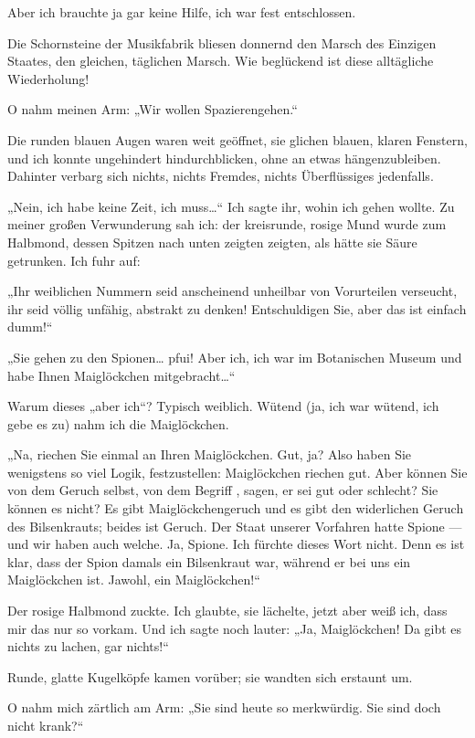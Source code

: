 Aber ich brauchte ja gar keine Hilfe, ich war fest entschlossen.

Die Schornsteine der Musikfabrik bliesen donnernd den Marsch des
Einzigen Staates, den gleichen, täglichen Marsch. Wie beglückend
ist diese alltägliche Wiederholung!

O nahm meinen Arm: „Wir wollen Spazierengehen.“

Die runden blauen
Augen waren weit geöffnet, sie glichen
blauen, klaren Fenstern, und ich konnte ungehindert
hindurchblicken, ohne an etwas hängenzubleiben. Dahinter verbarg
sich nichts, nichts Fremdes, nichts Überflüssiges jedenfalls.

„Nein, ich habe keine Zeit, ich muss\ldots{}“ Ich sagte ihr, wohin ich
gehen wollte. Zu meiner großen Verwunderung sah ich: der
kreisrunde, rosige Mund wurde zum Halbmond, dessen Spitzen nach
unten zeigten zeigten, als hätte sie Säure getrunken. Ich fuhr
auf:

„Ihr weiblichen Nummern seid anscheinend unheilbar von Vorurteilen
verseucht, ihr seid völlig unfähig, abstrakt zu denken!
Entschuldigen Sie, aber das ist einfach dumm!“

„Sie gehen zu den Spionen\ldots{} pfui! Aber ich, ich war im Botanischen
Museum und habe Ihnen Maiglöckchen mitgebracht\ldots{}“

Warum dieses „aber ich“? Typisch weiblich. Wütend (ja, ich war
wütend, ich gebe es zu) nahm ich die Maiglöckchen.

„Na, riechen Sie einmal an Ihren Maiglöckchen. Gut, ja? Also haben
Sie wenigstens so viel Logik, festzustellen: Maiglöckchen riechen
gut. Aber können Sie von dem Geruch selbst, von dem Begriff ,
sagen, er sei gut oder schlecht? Sie können es nicht? Es gibt
Maiglöckchengeruch und es gibt den widerlichen Geruch des
Bilsenkrauts; beides ist Geruch. Der Staat unserer Vorfahren hatte
Spione — und wir haben auch welche. Ja, Spione. Ich fürchte dieses
Wort nicht. Denn es ist klar, dass der Spion damals ein Bilsenkraut
war, während er bei uns ein Maiglöckchen ist. Jawohl, ein
Maiglöckchen!“

Der rosige Halbmond zuckte. Ich glaubte, sie
lächelte, jetzt aber weiß ich, dass mir das nur so vorkam. Und ich
sagte noch lauter: „Ja, Maiglöckchen! Da gibt es nichts zu lachen, gar nichts!“

Runde, glatte Kugelköpfe kamen vorüber; sie wandten sich erstaunt um.

O nahm mich zärtlich am Arm: „Sie sind heute so merkwürdig. Sie sind
doch nicht krank?“


